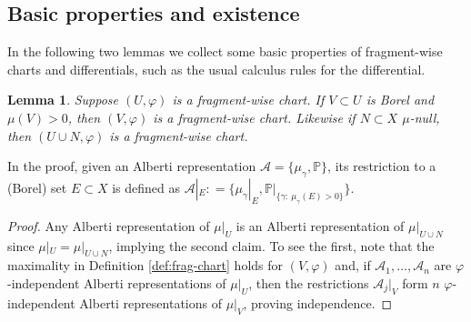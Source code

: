 \documentclass{amsart}
\newtheorem{lemma}[theorem]{Lemma}
\numberwithin{equation}{section}
\renewcommand{\P}{\mathbb{P}}
\newcommand{\defl}{\mathrel{\mathop:}=}
\begin{document}
\subsection{Basic properties and existence}\label{sec:basic-prop+exist}
In the following two lemmas we collect some basic properties of fragment-wise charts and differentials, such as the usual calculus rules for the differential.

\begin{lemma}\label{lem:basic-chart}
	Suppose $(U,\varphi)$ is a fragment-wise chart. If $V\subset U$ is Borel and $\mu(V)>0$, then $(V,\varphi)$ is a fragment-wise chart. Likewise if $N\subset X$ $\mu$-null, then $(U\cup N,\varphi)$ is a fragment-wise chart.
\end{lemma}
In the proof, given an Alberti representation $\mathcal A=\{\mu_\gamma,\P\}$, its restriction to a (Borel) set $E\subset X$ is defined as $\mathcal A|_E\defl \{\mu_\gamma|_E,\P|_{\{\gamma:\ \mu_\gamma(E)>0\}}\}$.
\begin{proof}
Any Alberti representation of $\mu|_U$ is an Alberti representation of $\mu|_{U\cup N}$ since $\mu|_U=\mu|_{U\cup N}$, implying the second claim. To see the first, note that the maximality in Definition \ref{def:frag-chart} holds for $(V,\varphi)$ and, if $\mathcal A_1,\ldots,\mathcal A_n$ are $\varphi$-independent Alberti representations of $\mu|_U$, then the restrictions $\mathcal A_j|_V$ form $n$ $\varphi$-independent Alberti representations of $\mu|_V$, proving independence. 
\end{proof}
\end{document}
